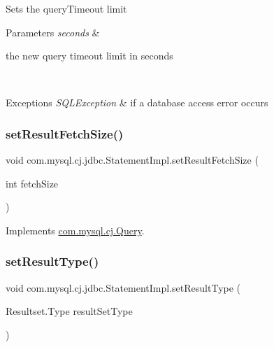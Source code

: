Sets the query\+Timeout limit


\begin{DoxyParams}{Parameters}
{\em seconds} & 
\begin{DoxyItemize}
\item the new query timeout limit in seconds
\end{DoxyItemize}\\
\hline
\end{DoxyParams}

\begin{DoxyExceptions}{Exceptions}
{\em S\+Q\+L\+Exception} & if a database access error occurs \\
\hline
\end{DoxyExceptions}
\mbox{\label{classcom_1_1mysql_1_1cj_1_1jdbc_1_1_statement_impl_a54925c630ea2ab107815206f742e7be9}} 
\subsubsection{\texorpdfstring{set\+Result\+Fetch\+Size()}{setResultFetchSize()}}
{\footnotesize\ttfamily void com.\+mysql.\+cj.\+jdbc.\+Statement\+Impl.\+set\+Result\+Fetch\+Size (\begin{DoxyParamCaption}\item[{int}]{fetch\+Size }\end{DoxyParamCaption})}



Implements \mbox{\hyperlink{interfacecom_1_1mysql_1_1cj_1_1_query_aa27382e91d04ac9f8f6944dc3949b652}{com.\+mysql.\+cj.\+Query}}.

\mbox{\label{classcom_1_1mysql_1_1cj_1_1jdbc_1_1_statement_impl_a7b30ea29a192772e8c464cec82eacb32}} 
\subsubsection{\texorpdfstring{set\+Result\+Type()}{setResultType()}}
{\footnotesize\ttfamily void com.\+mysql.\+cj.\+jdbc.\+Statement\+Impl.\+set\+Result\+Type (\begin{DoxyParamCaption}\item[{Resultset.\+Type}]{result\+Set\+Type }\end{DoxyParamCaption})}

